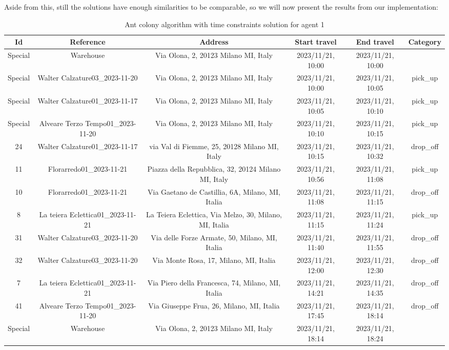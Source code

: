 \documentclass[titlepage]{article}
\begin{document}
Aside from this, still the solutions have enough similarities to be comparable, so we will now present the results from our implementation:

\begin{table}[H]
\centering
\begin{adjustbox}{max width=\textwidth}
\begin{tabular}{|c|c|c|c|c|c|}
\hline
Id & Reference & Address & Start travel & End travel & Category\\
\hline
\hline
Special & Warehouse & Via Olona, 2, 20123 Milano MI, Italy & 2023/11/21, 10:00 & 2023/11/21, 10:00 & \\
\hline
Special & Walter Calzature03\_2023-11-20 & Via Olona, 2, 20123 Milano MI, Italy & 2023/11/21, 10:00 & 2023/11/21, 10:05 & pick\_up \\
\hline
Special & Walter Calzature01\_2023-11-17 & Via Olona, 2, 20123 Milano MI, Italy & 2023/11/21, 10:05 & 2023/11/21, 10:10 & pick\_up \\
\hline
Special & Alveare Terzo Tempo01\_2023-11-20 & Via Olona, 2, 20123 Milano MI, Italy & 2023/11/21, 10:10 & 2023/11/21, 10:15 & pick\_up \\
\hline
24 & Walter Calzature01\_2023-11-17 & via Val di Fiemme, 25, 20128 Milano MI, Italy & 2023/11/21, 10:15 & 2023/11/21, 10:32 & drop\_off \\
\hline
11 & Florarredo01\_2023-11-21 & Piazza della Repubblica, 32, 20124 Milano MI, Italy & 2023/11/21, 10:56 & 2023/11/21, 11:08 & pick\_up \\
\hline
10 & Florarredo01\_2023-11-21 & Via Gaetano de Castillia, 6A, Milano, MI, Italia & 2023/11/21, 11:08 & 2023/11/21, 11:15 & drop\_off \\
\hline
8 & La teiera Eclettica01\_2023-11-21 & La Teiera Eclettica, Via Melzo, 30, Milano, MI, Italia & 2023/11/21, 11:15 & 2023/11/21, 11:24 & pick\_up \\
\hline
31 & Walter Calzature03\_2023-11-20 & Via delle Forze Armate, 50, Milano, MI, Italia & 2023/11/21, 11:40 & 2023/11/21, 11:55 & drop\_off \\
\hline
32 & Walter Calzature03\_2023-11-20 & Via Monte Rosa, 17, Milano, MI, Italia & 2023/11/21, 12:00 & 2023/11/21, 12:30 & drop\_off \\
\hline
7 & La teiera Eclettica01\_2023-11-21 & Via Piero della Francesca, 74, Milano, MI, Italia & 2023/11/21, 14:21 & 2023/11/21, 14:35 & drop\_off \\
\hline
41 & Alveare Terzo Tempo01\_2023-11-20 & Via Giuseppe Frua, 26, Milano, MI, Italia & 2023/11/21, 17:45 & 2023/11/21, 18:14 & drop\_off \\
\hline
Special & Warehouse & Via Olona, 2, 20123 Milano MI, Italy & 2023/11/21, 18:14 & 2023/11/21, 18:24 & \\
\hline
\end{tabular}
\end{adjustbox}
\caption{Ant colony algorithm with time constraints solution for agent 1}
\label{tab:mysolution1}
\end{table}
\end{document}
